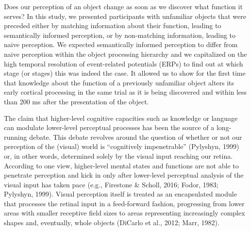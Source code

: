 \documentclass[
  english,
  doc,12pt,twoside,floatsintext]{apa7}
\begin{document}
Does our perception of an object change as soon as we discover what function it serves? In this study, we presented participants with unfamiliar objects that were preceded either by matching information about their function, leading to semantically informed perception, or by non-matching information, leading to naive perception. We expected semantically informed perception to differ from naive perception within the object processing hierarchy and we capitalized on the high temporal resolution of event-related potentials (ERPs) to find out at which stage (or stages) this was indeed the case. It allowed us to show for the first time that knowledge about the function of a previously unfamiliar object alters its early cortical processing in the same trial as it is being discovered and within less than 200 ms after the presentation of the object.

The claim that higher-level cognitive capacities such as knowledge or language can modulate lower-level perceptual processes has been the source of a long-running debate. This debate revolves around the question of whether or not our perception of the (visual) world is ``cognitively impenetrable'' (Pylyshyn, 1999) or, in other words, determined solely by the visual input reaching our retina. According to one view, higher-level mental states and functions are not able to penetrate perception and kick in only after lower-level perceptual analysis of the visual input has taken pace (e.g., Firestone \& Scholl, 2016; Fodor, 1983; Pylyshyn, 1999). Visual perception itself is treated as an encapsulated module that processes the retinal input in a feed-forward fashion, progressing from lower areas with smaller receptive field sizes to areas representing increasingly complex shapes and, eventually, whole objects (DiCarlo et al., 2012; Marr, 1982).
\end{document}
